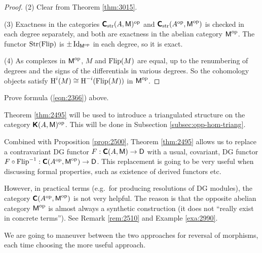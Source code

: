 \begin{proof}
\medskip \noindent 
(2) Clear from Theorem \ref{thm:3015}.

\medskip \noindent 
(3) Exactness in the categories 
$\boldsymbol{\mathsf{C}}_{\mathrm{str}}(A, \operatorname{\mathsf{M}})^{\mathrm{op}}$
and 
$\boldsymbol{\mathsf{C}}_{\mathrm{str}}(A^{\mathrm{op}}, \operatorname{\mathsf{M}}^{\mathrm{op}})$
is checked in each degree separately, and both are exactness in the abelian 
category $\operatorname{\mathsf{M}}^{\mathrm{op}}$. The functor
$\operatorname{Str}(\operatorname{Flip})$ is $\pm \operatorname{Id}_{\operatorname{\mathsf{M}}^{\mathrm{op}}}$
in each degree, so it is exact. 

\medskip \noindent 
(4) As complexes in $\operatorname{\mathsf{M}}^{\mathrm{op}}$, $M$ and $\operatorname{Flip}(M)$ are equal, up 
to the renumbering of degrees and the signs of the differentials in various 
degrees. So the cohomology objects satisfy 
$\operatorname{H}^i(M) \cong \operatorname{H}^{-i}(\operatorname{Flip}(M))$
in $\operatorname{\mathsf{M}}^{\mathrm{op}}$. 
\end{proof}

\begin{exer} \label{exer:2365}
Prove formula (\ref{eqn:2366}) above. 
\end{exer}



\begin{rem} \label{rem:2505}
Theorem \ref{thm:2495} will be used to introduce a triangulated structure on 
the category $\boldsymbol{\mathsf{K}}(A, \operatorname{\mathsf{M}})^{\mathrm{op}}$. This will be done in Subsection 
\ref{subsec:opp-hom-triang}.  

Combined with Proposition \ref{prop:2500}, Theorem \ref{thm:2495} allows us to 
replace a contravariant DG functor 
$F : \boldsymbol{\mathsf{C}}(A, \operatorname{\mathsf{M}}) \to \operatorname{\mathsf{D}}$
with a usual, covariant, DG functor 
$F \circ \operatorname{Flip}^{-1} : \boldsymbol{\mathsf{C}}(A^{\mathrm{op}}, \operatorname{\mathsf{M}}^{\mathrm{op}})
\to \operatorname{\mathsf{D}}$.
This replacement is going to be very useful when discussing formal properties, 
such as existence of derived functors etc. 

However, in practical terms (e.g.\ for producing resolutions of DG modules),
the category $\boldsymbol{\mathsf{C}}(A^{\mathrm{op}}, \operatorname{\mathsf{M}}^{\mathrm{op}})$ is not very 
helpful. The reason is that the opposite abelian category 
$\operatorname{\mathsf{M}}^{\mathrm{op}}$ is almost always a synthetic construction (it does not 
``really exist in concrete terms''). See Remark \ref{rem:2510} and 
Example \ref{exa:2990}. 

We are going to maneuver between the two approaches for reversal of morphisms, 
each time choosing the more useful approach. 
\end{rem}







